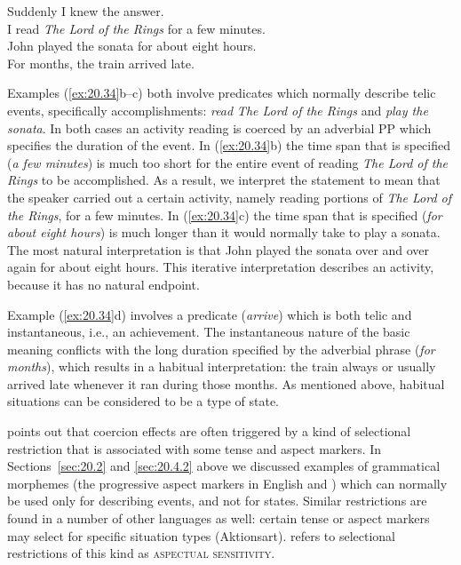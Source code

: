\ea \label{ex:20.34}
\ea  Suddenly I knew the answer.\\
\ex I read \textit{The Lord of the Rings} for a few minutes.\\
\ex John played the sonata for about eight hours.\\
\ex For months, the train arrived late.
                       \z
\z


Examples (\ref{ex:20.34}b--c) both involve predicates which normally describe telic events, specifically accomplishments: \textit{read} \textit{The Lord of the Rings} and \textit{play the sonata}. In both cases an activity reading is coerced by an adverbial PP which specifies the duration of the event. In (\ref{ex:20.34}b) the time span that is specified (\textit{a few minutes}) is much too short for the entire event of reading \textit{The Lord of the Rings} to be accomplished. As a result, we interpret the statement to mean that the speaker carried out a certain activity, namely reading portions of \textit{The Lord of the Rings}, for a few minutes. In (\ref{ex:20.34}c) the time span that is specified (\textit{for about eight hours}) is much longer than it would normally take to play a sonata. The most natural interpretation is that John played the sonata over and over again for about eight hours. This iterative interpretation describes an activity, because it has no natural endpoint.



Example (\ref{ex:20.34}d) involves a predicate (\textit{arrive}) which is both telic and instantaneous, i.e., an achievement. The instantaneous nature of the basic meaning conflicts with the long duration specified by the adverbial phrase (\textit{for months}), which results in a habitual interpretation: the train always or usually arrived late whenever it ran during those months. As mentioned above, habitual situations can be considered to be a type of state.



 points out that coercion effects are often triggered by a kind of selectional restriction that is associated with some tense and aspect markers. In Sections~\ref{sec:20.2} and \ref{sec:20.4.2} above we discussed examples of grammatical morphemes (the progressive aspect markers in English and ) which can normally be used only for describing events, and not for states. Similar restrictions are found in a number of other languages as well: certain tense or aspect markers may select for specific situation types (Aktionsart).  refers to selectional restrictions of this kind as \textsc{aspectual sensitivity}.



